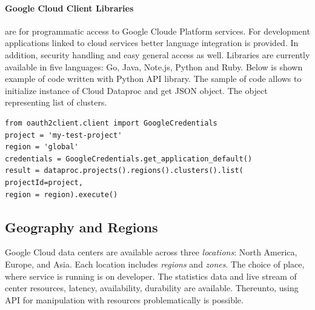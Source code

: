 \documentclass[a4paper,12pt,oneside]{report}
\begin{document}
	\paragraph{Google Cloud Client Libraries} are for programmatic access to Google
	Cloude Platform services. For development applications 
	linked to cloud services better language integration is provided. In addition,
	security handling and easy general access as well. Libraries are currently 
	available in five languages: Go, Java, Note.js, Python and Ruby. Below is shown 
	example of code written with Python API library.  The sample of code allows to
	initialize  
	instance of Cloud Dataproc and get JSON object. The object representing list of
	clusters.
	
	\begin{footnotesize}
		\begin{lstlisting}[style=python]
from oauth2client.client import GoogleCredentials
project = 'my-test-project'
region = 'global'
credentials = GoogleCredentials.get_application_default()
result = dataproc.projects().regions().clusters().list(
projectId=project,
region = region).execute()
		\end{lstlisting}\end{footnotesize}
	
	
	
	\subsection{Geography and Regions}
	Google Cloud data centers are available across three \textit{locations}: North
	America, Europe, and Asia. Each location includes 
	\textit{regions} and \textit{zones}. The choice of place, where service is
	running is on developer. The statistics data and live stream of 
	center resources, latency, availability, durability are available. Thereunto,
	using API  for manipulation with resources problematically is possible. 
	
\end{document}

